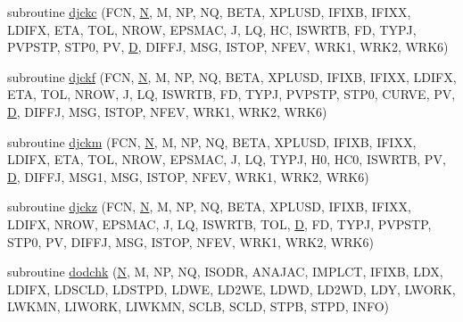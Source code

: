 \begin{DoxyCompactItemize}
\item 
subroutine \hyperlink{d__odr_8f_a1fde60534f7b07740e8b6f6896d1b5b5}{djckc} (F\+C\+N, \hyperlink{polmisc_8c_a0240ac851181b84ac374872dc5434ee4}{N}, M, N\+P, N\+Q, B\+E\+T\+A, X\+P\+L\+U\+S\+D, I\+F\+I\+X\+B, I\+F\+I\+X\+X, L\+D\+I\+F\+X, E\+T\+A, T\+O\+L, N\+R\+O\+W, E\+P\+S\+M\+A\+C, J, L\+Q, H\+C, I\+S\+W\+R\+T\+B, F\+D, T\+Y\+P\+J, P\+V\+P\+S\+T\+P, S\+T\+P0, P\+V, \hyperlink{odrpack_8h_a7dae6ea403d00f3687f24a874e67d139}{D}, D\+I\+F\+F\+J, M\+S\+G, I\+S\+T\+O\+P, N\+F\+E\+V, W\+R\+K1, W\+R\+K2, W\+R\+K6)
\item 
subroutine \hyperlink{d__odr_8f_a21488ddcee59d58b194f54d0b7ca9f86}{djckf} (F\+C\+N, \hyperlink{polmisc_8c_a0240ac851181b84ac374872dc5434ee4}{N}, M, N\+P, N\+Q, B\+E\+T\+A, X\+P\+L\+U\+S\+D, I\+F\+I\+X\+B, I\+F\+I\+X\+X, L\+D\+I\+F\+X, E\+T\+A, T\+O\+L, N\+R\+O\+W, J, L\+Q, I\+S\+W\+R\+T\+B, F\+D, T\+Y\+P\+J, P\+V\+P\+S\+T\+P, S\+T\+P0, C\+U\+R\+V\+E, P\+V, \hyperlink{odrpack_8h_a7dae6ea403d00f3687f24a874e67d139}{D}, D\+I\+F\+F\+J, M\+S\+G, I\+S\+T\+O\+P, N\+F\+E\+V, W\+R\+K1, W\+R\+K2, W\+R\+K6)
\item 
subroutine \hyperlink{d__odr_8f_acd242f9a5156507fc15b9a5311a72909}{djckm} (F\+C\+N, \hyperlink{polmisc_8c_a0240ac851181b84ac374872dc5434ee4}{N}, M, N\+P, N\+Q, B\+E\+T\+A, X\+P\+L\+U\+S\+D, I\+F\+I\+X\+B, I\+F\+I\+X\+X, L\+D\+I\+F\+X, E\+T\+A, T\+O\+L, N\+R\+O\+W, E\+P\+S\+M\+A\+C, J, L\+Q, T\+Y\+P\+J, H0, H\+C0, I\+S\+W\+R\+T\+B, P\+V, \hyperlink{odrpack_8h_a7dae6ea403d00f3687f24a874e67d139}{D}, D\+I\+F\+F\+J, M\+S\+G1, M\+S\+G, I\+S\+T\+O\+P, N\+F\+E\+V, W\+R\+K1, W\+R\+K2, W\+R\+K6)
\item 
subroutine \hyperlink{d__odr_8f_a063566962f5078f860eeb00736878b3e}{djckz} (F\+C\+N, \hyperlink{polmisc_8c_a0240ac851181b84ac374872dc5434ee4}{N}, M, N\+P, N\+Q, B\+E\+T\+A, X\+P\+L\+U\+S\+D, I\+F\+I\+X\+B, I\+F\+I\+X\+X, L\+D\+I\+F\+X, N\+R\+O\+W, E\+P\+S\+M\+A\+C, J, L\+Q, I\+S\+W\+R\+T\+B, T\+O\+L, \hyperlink{odrpack_8h_a7dae6ea403d00f3687f24a874e67d139}{D}, F\+D, T\+Y\+P\+J, P\+V\+P\+S\+T\+P, S\+T\+P0, P\+V, D\+I\+F\+F\+J, M\+S\+G, I\+S\+T\+O\+P, N\+F\+E\+V, W\+R\+K1, W\+R\+K2, W\+R\+K6)
\item 
subroutine \hyperlink{d__odr_8f_a890b22d16ef255361352fda0d92193e7}{dodchk} (\hyperlink{polmisc_8c_a0240ac851181b84ac374872dc5434ee4}{N}, M, N\+P, N\+Q, I\+S\+O\+D\+R, A\+N\+A\+J\+A\+C, I\+M\+P\+L\+C\+T, I\+F\+I\+X\+B, L\+D\+X, L\+D\+I\+F\+X, L\+D\+S\+C\+L\+D, L\+D\+S\+T\+P\+D, L\+D\+W\+E, L\+D2\+W\+E, L\+D\+W\+D, L\+D2\+W\+D, L\+D\+Y, L\+W\+O\+R\+K, L\+W\+K\+M\+N, L\+I\+W\+O\+R\+K, L\+I\+W\+K\+M\+N, S\+C\+L\+B, S\+C\+L\+D, S\+T\+P\+B, S\+T\+P\+D, I\+N\+F\+O)

\end{DoxyCompactItemize}
